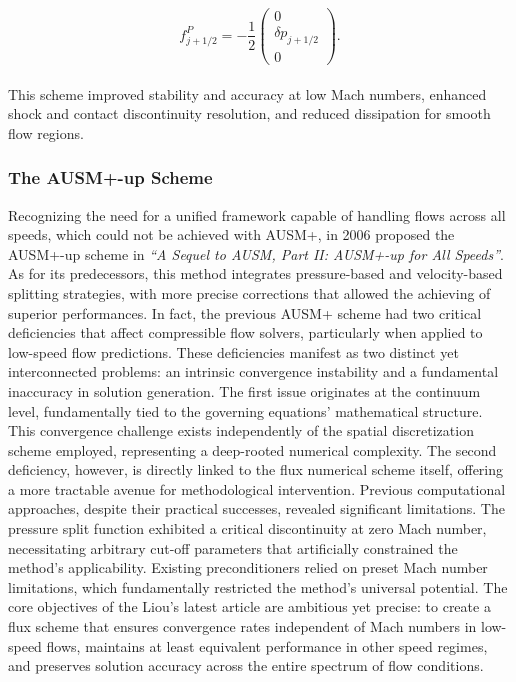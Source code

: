 \documentclass[a5paper]{sapthesis}
\begin{document}
	\begin{equation}
		f_{j+1/2}^P = -\dfrac{1}{2}
		\begin{pmatrix}
			0 \\
			\delta p_{j+1/2}\\
			0
		\end{pmatrix}.
	\end{equation}
	\\
	This scheme improved stability and accuracy at low Mach numbers, enhanced shock and contact discontinuity resolution, and reduced dissipation for smooth flow regions.
	
	\subsubsection{The AUSM+-up Scheme}
	
	Recognizing the need for a unified framework capable of handling flows across all speeds, which could not be achieved with AUSM+, in 2006 \citet{LIOU_AUSM+-up} proposed the AUSM+-up scheme in \textit{“A Sequel to AUSM, Part II: AUSM+-up for All Speeds”}. As for its predecessors, this method integrates pressure-based and velocity-based splitting strategies, with more precise corrections that allowed the achieving of superior performances. In fact, the previous AUSM+ scheme had two critical deficiencies that affect compressible flow solvers, particularly when applied to low-speed flow predictions. These deficiencies manifest as two distinct yet interconnected problems: an intrinsic convergence instability and a fundamental inaccuracy in solution generation.
	The first issue originates at the continuum level, fundamentally tied to the governing equations' mathematical structure. This convergence challenge exists independently of the spatial discretization scheme employed, representing a deep-rooted numerical complexity. The second deficiency, however, is directly linked to the flux numerical scheme itself, offering a more tractable avenue for methodological intervention.
	Previous computational approaches, despite their practical successes, revealed significant limitations. The pressure split function exhibited a critical discontinuity at zero Mach number, necessitating arbitrary cut-off parameters that artificially constrained the method's applicability. Existing preconditioners relied on preset Mach number limitations, which fundamentally restricted the method's universal potential. The core objectives of the Liou's latest article are ambitious yet precise: to create a flux scheme that ensures convergence rates independent of Mach numbers in low-speed flows, maintains at least equivalent performance in other speed regimes, and preserves solution accuracy across the entire spectrum of flow conditions.
	
\end{document}
